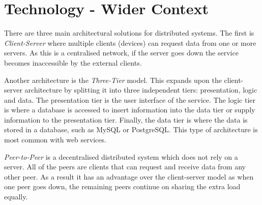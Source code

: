 \chapter{Technology - Wider Context}

There are three main architectural solutions for distributed systems. The first is \textit{Client-Server} where multiple clients (devices) can request data from one or more servers. As this is a centralised network, if the server goes down the service becomes inaccessible by the external clients.

Another architecture is the \textit{Three-Tier} model. This expands upon the client-server architecture by splitting it into three independent tiers: presentation, logic and data. The presentation tier is the user interface of the service. The logic tier is where a database is accessed to insert information into the data tier or supply information to the presentation tier. Finally, the data tier is where the data is stored in a database, such as MySQL or PostgreSQL. This type of architecture is most common with web services.

\textit{Peer-to-Peer} is a decentralised distributed system which does not rely on a server. All of the peers are clients that can request and receive data from any other peer. As a result it has an advantage over the client-server model as when one peer goes down, the remaining peers continue on sharing the extra load equally.
